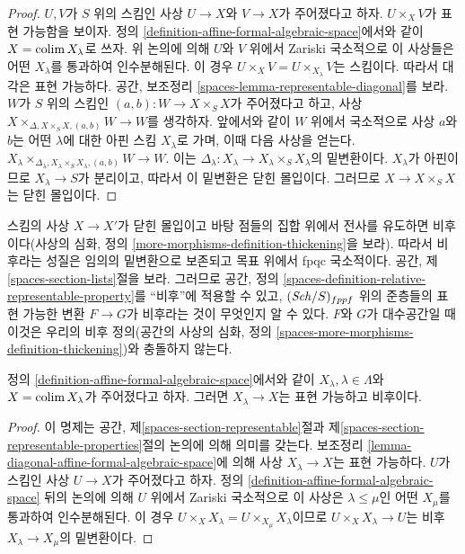 \begin{proof}
$U, V$가 $S$ 위의 스킴인 사상 $U \to X$와 $V \to X$가 주어졌다고
하자. $U \times_X V$가 표현 가능함을 보이자. 정의
\ref{definition-affine-formal-algebraic-space}에서와 같이
$X = \mathop{\mathrm{colim}}\nolimits X_\lambda$로 쓰자. 위 논의에 의해 $U$와 $V$ 위에서
Zariski 국소적으로 이 사상들은 어떤 $X_\lambda$를 통과하여
인수분해된다.
이 경우 $U \times_X V = U \times_{X_\lambda} V$는 스킴이다.
따라서 대각은 표현 가능하다. 공간, 보조정리
\ref{spaces-lemma-representable-diagonal}를 보라. $W$가 $S$ 위의
스킴인 $(a, b) : W \to X \times_S X$가 주어졌다고 하고, 사상
$X \times_{\Delta, X \times_S X, (a, b)} W \to W$를 생각하자.
앞에서와 같이 $W$ 위에서 국소적으로 사상 $a$와 $b$는 어떤
$\lambda$에 대한 아핀 스킴 $X_\lambda$로 가며, 이때 다음 사상을 얻는다.
$X_\lambda
\times_{\Delta_\lambda, X_\lambda \times_S X_\lambda, (a, b)} W \to W$.
이는 $\Delta_\lambda : X_\lambda \to X_\lambda \times_S X_\lambda$의
밑변환이다. $X_\lambda$가 아핀이므로 $X_\lambda \to S$가 분리이고,
따라서 이 밑변환은 닫힌 몰입이다. 그러므로
$X \to X \times_S X$는 닫힌 몰입이다.
\end{proof}

\noindent
스킴의 사상 $X \to X'$가 닫힌 몰입이고 바탕 점들의 집합 위에서
전사를 유도하면 비후이다(사상의 심화, 정의
\ref{more-morphisms-definition-thickening}을 보라). 따라서 비후라는
성질은 임의의 밑변환으로 보존되고 목표 위에서 fpqc 국소적이다.
공간, 제\ref{spaces-section-lists}절을 보라. 그러므로 공간, 정의
\ref{spaces-definition-relative-representable-property}를 ``비후''에
적용할 수 있고, $(\mathit{Sch}/S)_{fppf}$ 위의 준층들의 표현 가능한 변환
$F \to G$가 비후라는 것이 무엇인지 알 수 있다. $F$와 $G$가
대수공간일 때 이것은 우리의 비후 정의(공간의 사상의 심화, 정의
\ref{spaces-more-morphisms-definition-thickening})와 충돌하지 않는다.

\begin{lemma}
\label{lemma-covering-by-thickenings}
정의 \ref{definition-affine-formal-algebraic-space}에서와 같이
$X_\lambda, \lambda \in \Lambda$와 $X = \mathop{\mathrm{colim}}\nolimits X_\lambda$가 주어졌다고
하자. 그러면 $X_\lambda \to X$는 표현 가능하고 비후이다.
\end{lemma}

\begin{proof}
이 명제는 공간, 제\ref{spaces-section-representable}절과
제\ref{spaces-section-representable-properties}절의 논의에 의해
의미를 갖는다. 보조정리
\ref{lemma-diagonal-affine-formal-algebraic-space}에 의해 사상
$X_\lambda \to X$는 표현 가능하다. $U$가 스킴인 사상 $U \to X$가
주어졌다고 하자. 정의 \ref{definition-affine-formal-algebraic-space}
뒤의 논의에 의해 $U$ 위에서 Zariski 국소적으로 이 사상은
$\lambda \leq \mu$인 어떤 $X_\mu$를 통과하여 인수분해된다. 이 경우
$U \times_X X_\lambda = U \times_{X_\mu} X_\lambda$이므로
$U \times_X X_\lambda \to U$는 비후 $X_\lambda \to X_\mu$의
밑변환이다.
\end{proof}

